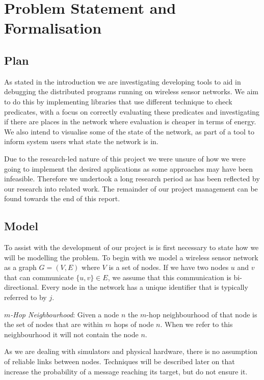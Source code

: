 \section{Problem Statement and Formalisation}

\subsection{Plan}

As stated in the introduction we are investigating developing tools to aid in debugging the distributed programs running on wireless sensor networks. We aim to do this by implementing libraries that use different technique to check predicates, with a focus on correctly evaluating these predicates and investigating if there are places in the network where evaluation is cheaper in terms of energy. We also intend to visualise some of the state of the network, as part of a tool to inform system users what state the network is in.

Due to the research-led nature of this project we were unsure of how we were going to implement the desired applications as some approaches may have been infeasible. Therefore we undertook a long research period as has been reflected by our research into related work. The remainder of our project management can be found towards the end of this report.

\subsection{Model}

To assist with the development of our project is is first necessary to state how we will be modelling the problem. To begin with we model a wireless sensor network as a graph $G = (V, E)$ where $V$ is a set of nodes. If we have two nodes $u$ and $v$ that can communicate $\{u, v\} \in E$, we assume that this communication is bi-directional. Every node in the network has a unique identifier that is typically referred to by $j$.

\begin{mydef}
\emph{$m$-Hop Neighbourhood}: Given a node $n$ the $m$-hop neighbourhood of that node is the set of nodes that are within $m$ hops of node $n$. When we refer to this neighbourhood it will not contain the node $n$.
\end{mydef}

As we are dealing with simulators and physical hardware, there is no assumption of reliable links between nodes. Techniques will be described later on that increase the probability of a message reaching its target, but do not ensure it.

